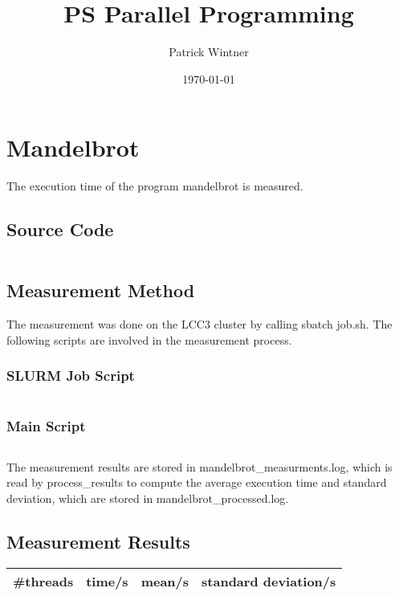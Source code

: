 \documentclass[parskip]{scrartcl}
\title{PS Parallel Programming}
\author{Patrick Wintner}
\date{\today}
\begin{document}
	\maketitle
	
	\section{Mandelbrot}
	The execution time of the program mandelbrot is measured.
	\subsection{Source Code}
	\inputminted{c}{mandelbrot/mandelbrot.c}
	\subsection{Measurement Method}
	The measurement was done on the LCC3 cluster by calling sbatch job.sh. The following scripts are involved in the measurement process.
	\subsubsection{SLURM Job Script}
	\inputminted{bash}{mandelbrot/job.sh}
	\subsubsection{Main Script}
	\inputminted{bash}{mandelbrot/main.sh}
	
	The measurement results are stored in mandelbrot\_measurments.log, which is read by process\_results to compute the average execution time and standard deviation, which are stored in mandelbrot\_processed.log.
	
	\subsection{Measurement Results}
	\begin{tabular}{|c|c|c|c|}
		\hline \#threads & time/s & mean/s & standard deviation/s\\
		\hline
	\end{tabular}
\end{document}
